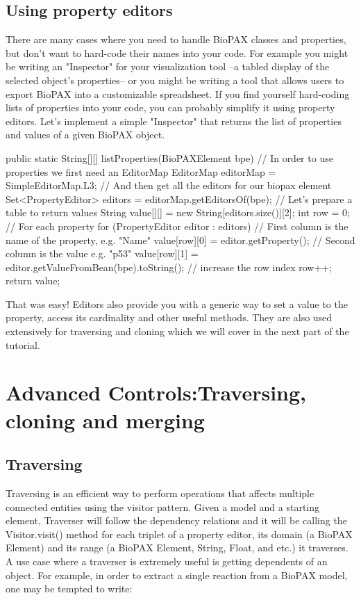 \documentclass{tufte-book}
\begin{document}
\section{Using property editors}
There are many cases where you need to handle BioPAX classes and properties, but don't want to hard-code their names into your code. For example you might be writing an "Inspector" for your visualization tool --a tabled display of the selected object's properties-- or you might be writing a tool that allows users to export BioPAX into a customizable spreadsheet. If you find yourself hard-coding lists of properties into your code, you can probably simplify it using property editors.
Let's implement a simple "Inspector" that returns the list of properties and values of a given BioPAX object.

\begin{javacode}
public static String[][] listProperties(BioPAXElement bpe)
 {
  // In order to use properties we first need an EditorMap
  EditorMap editorMap = SimpleEditorMap.L3;
  // And then get all the editors for our biopax element
  Set<PropertyEditor> editors = editorMap.getEditorsOf(bpe);
  // Let's prepare a table to return values
  String value[][] = new String[editors.size()][2];
  int row = 0;
  // For each property
  for (PropertyEditor editor : editors)
  {
   // First column is the name of the property, e.g. "Name"
   value[row][0] = editor.getProperty();
   // Second column is the value e.g. "p53"
   value[row][1] = editor.getValueFromBean(bpe).toString();
   // increase the row index
   row++;
  }
  return value;
 }
\end{javacode}

That was easy! 
Editors also provide you with a generic way to set a value to the property, access its cardinality and other useful methods.  They are also used extensively for traversing and cloning which we will cover in the next part of the tutorial.

\chapter{Advanced Controls:Traversing, cloning and merging}
\section{Traversing}
Traversing is an efficient way to perform operations that affects multiple connected entities using the visitor pattern. Given a model and a starting element, Traverser will follow the dependency relations and it will be calling the Visitor.visit() method for each triplet of a property editor, its domain (a BioPAX Element) and its range (a BioPAX Element, String, Float, and etc.) it traverses. 
A use case where a traverser is extremely useful is getting dependents of an object. For example, in order to extract a single reaction from a BioPAX model, one may be tempted to write:
\end{document}
